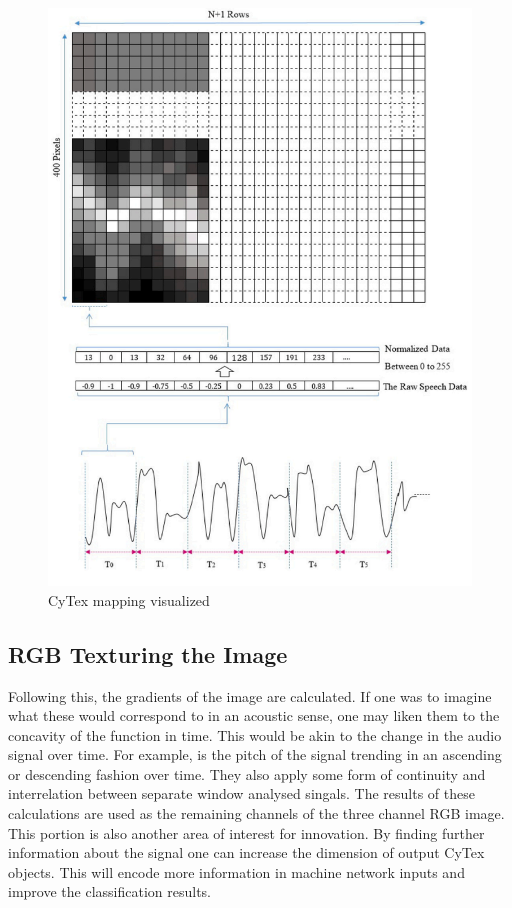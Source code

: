 \begin{figure}
        \centering
        \includegraphics[scale = 1.2]{images/CyTex-diagram.png}
        \caption{CyTex mapping visualized \cite{CyTexRef}}
        \label{cytexVis_example}
\end{figure}

\subsection{RGB Texturing the Image}
Following this, the gradients of the image are calculated. If one was to imagine what these would correspond to in an acoustic sense, one may liken them to the concavity of the function in time. This would be akin to the change in the audio signal over time. For example, is the pitch of the signal trending in an ascending or descending fashion over time. They also apply some form of continuity and interrelation between separate window analysed singals. The results of these calculations are used as the remaining channels of the three channel RGB image. This portion is also another area of interest for innovation. By finding further information about the signal one can increase the dimension of output CyTex objects. This will encode more information in machine network inputs and improve the classification results. 


